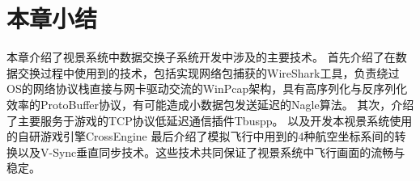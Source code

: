\section{本章小结}
本章介绍了视景系统中数据交换子系统开发中涉及的主要技术。
首先介绍了在数据交换过程中使用到的技术，包括实现网络包捕获的WireShark工具，负责绕过OS的网络协议栈直接与网卡驱动交流的WinPcap架构，具有高序列化与反序列化效率的ProtoBuffer协议，有可能造成小数据包发送延迟的Nagle算法。
其次，介绍了主要服务于游戏的TCP协议低延迟通信插件Tbuspp。
以及开发本视景系统使用的自研游戏引擎CrossEngine
最后介绍了模拟飞行中用到的4种航空坐标系间的转换以及V-Sync垂直同步技术。这些技术共同保证了视景系统中飞行画面的流畅与稳定。
